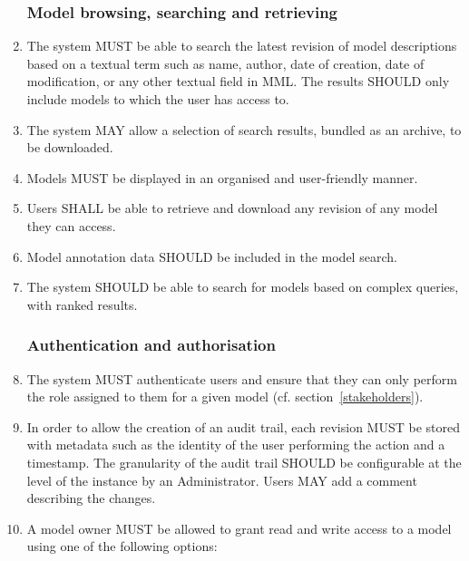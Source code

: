 \begin{enumerate}[1]
\subsubsection{Model browsing, searching and retrieving}
\item The system MUST be able to search the latest revision of model descriptions based on a textual term such as name, author, date of creation, date of modification, or any other textual field in MML. The results SHOULD only include models to which the user has access to.

\item The system MAY allow a selection of search results, bundled as an archive, to be downloaded.

\item Models MUST be displayed in an organised and user-friendly manner.

\item Users SHALL be able to retrieve and download any revision of any model they can access.

\item Model annotation data SHOULD be included in the model search.

\item The system SHOULD be able to search for models based on complex queries, with ranked results.

\subsubsection{Authentication and authorisation}
\item The system MUST authenticate users and ensure that they can only perform the role assigned to them for a given model (cf. section~\ref{stakeholders}).

\item In order to allow the creation of an audit trail, each revision MUST be stored with metadata such as the identity of the user performing the action and a timestamp. The granularity of the audit trail SHOULD be configurable at the level of the instance by an Administrator. Users MAY add a comment describing the changes.

\item A model owner MUST be allowed to grant read and write access to a model using one of the following options:


\end{enumerate}
